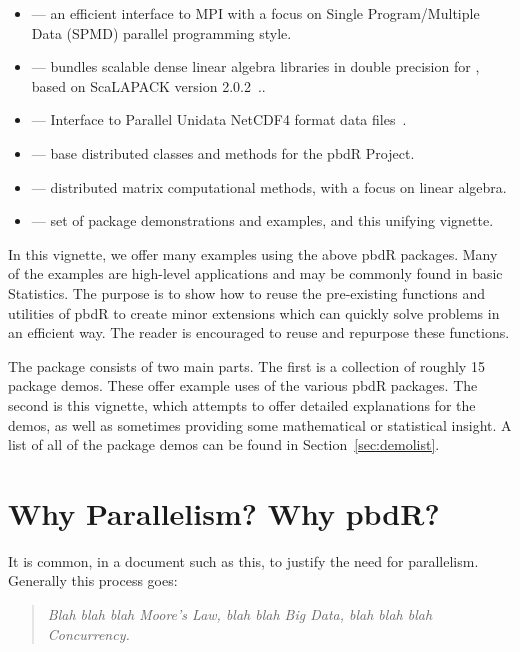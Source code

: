 \begin{itemize}
 \item {} --- an efficient interface to MPI with a focus on Single Program/Multiple Data (SPMD) parallel programming style.
 \item {} --- bundles scalable dense linear algebra libraries in double precision for , based on ScaLAPACK version 2.0.2~\citep{slug}..
 \item {} --- Interface to Parallel Unidata NetCDF4 format data files~\citep{netcdf}.
 \item {} --- base distributed classes and methods for the pbdR Project.
 \item {} --- distributed matrix computational methods, with a focus on linear algebra.
 \item {} --- set of package demonstrations and examples, and this unifying vignette.
\end{itemize}

In this vignette, we offer many examples using the above pbdR packages.  Many of the examples are high-level
applications and may be commonly found in basic Statistics.  The purpose is to show how to reuse the pre-existing functions and utilities of pbdR to create minor extensions which can quickly solve problems in an efficient way.  The reader is encouraged to reuse and repurpose these functions.

The  package consists of two main parts.  The first is a collection of roughly 15 package demos.  These offer example uses of the various pbdR packages.  The second is this vignette, which attempts to offer detailed explanations for the demos, as well as sometimes providing some mathematical or statistical insight.  A list of all of the package demos can be found in Section~\ref{sec:demolist}.



\section{Why Parallelism?  Why pbdR?}

It is common, in a document such as this, to justify the need for parallelism.  Generally this process goes:

\begin{quote}
\emph{
Blah blah blah Moore's Law, blah blah Big Data, blah blah blah Concurrency.
}
\end{quote}

